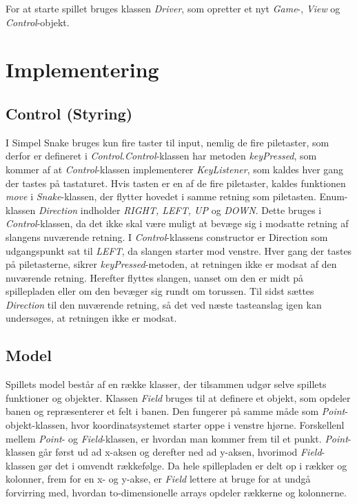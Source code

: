 \documentclass{report}
\begin{document}
For at starte spillet bruges klassen \textit{Driver}, som opretter et nyt \textit{Game}-, \textit{View} og \textit{Control}-objekt.



\section{Implementering}
\subsection{Control (Styring)}
I Simpel Snake bruges kun fire taster til input, nemlig de fire piletaster, som derfor er defineret i \textit{Control}.\textit{Control}-klassen har metoden \textit{keyPressed}, som kommer af at \textit{Control}-klassen implementerer \textit{KeyListener}, som kaldes hver gang der tastes på tastaturet. Hvis tasten er en af de fire piletaster, kaldes funktionen \textit{move} i \textit{Snake}-klassen, der flytter hovedet i samme retning som piletasten.
Enum-klassen \textit{Direction} indholder \textit{RIGHT, LEFT, UP} og \textit{DOWN}. Dette bruges i \textit{Control}-klassen, da det ikke skal være muligt at bevæge sig i modsatte retning af slangens nuværende retning.
I \textit{Control}-klassens constructor er Direction som udgangspunkt sat til \textit{LEFT}, da slangen starter mod venstre. Hver gang der tastes på piletasterne, sikrer \textit{keyPressed}-metoden, at retningen ikke er modsat af den nuværende retning. Herefter flyttes slangen, uanset om den er midt på spillepladen eller om den bevæger sig rundt om torussen. Til sidst sættes \textit{Direction} til den nuværende retning, så det ved næste tasteanslag igen kan undersøges, at retningen ikke er modsat.

\subsection{Model}
Spillets model består af en række klasser, der tilsammen udgør selve spillets funktioner og objekter.
Klassen \textit{Field} bruges til at definere et objekt, som opdeler banen og repræsenterer et felt i banen. Den fungerer på samme måde som \textit{Point}-objekt-klassen, hvor koordinatsystemet starter oppe i venstre hjørne. Forskellenl mellem \textit{Point}- og \textit{Field}-klassen, er hvordan man kommer frem til et punkt. \textit{Point}-klassen går først ud ad x-aksen og derefter ned ad y-aksen, hvorimod \textit{Field}-klassen gør det i omvendt rækkefølge. Da hele spillepladen er delt op i rækker og kolonner, frem for en x- og y-akse, er \textit{Field} lettere at bruge for at undgå forvirring med, hvordan to-dimensionelle arrays opdeler rækkerne og kolonnerne.
\end{document}

